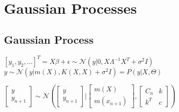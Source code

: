 \section{Gaussian Processes}
\subsection*{Gaussian Process}

$[y_1, y_2, ...]^T\!=\!X\beta\!+\!\epsilon \sim \mathcal{N}(y|0,X \Lambda^{-1} X^T+ \sigma^2 I) $
$y \sim \mathcal{N}(y | m(X), K(X,X) + \sigma^2 I) = P(y|X,\Theta)$ 

                    
$\left[\begin{smallmatrix} y \\y_{n+1}\end{smallmatrix}\right] \sim \mathcal{N}\left(\left[\begin{smallmatrix} y \\y_{n+1}\end{smallmatrix}\right]|[\begin{smallmatrix} m(X) \\m(x_{n+1})\end{smallmatrix}], [\begin{smallmatrix} C_n & k \\ k^T & c\end{smallmatrix}]\right)$
	
